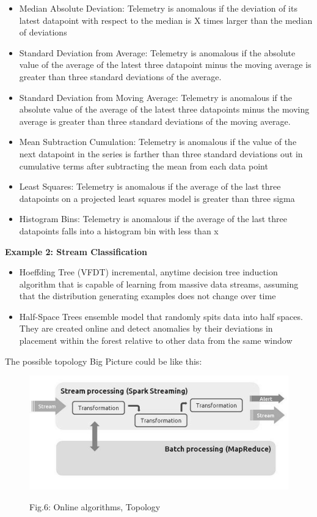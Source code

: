 \documentclass[10pt, a5paper]{article}
\begin{document}
\begin{itemize}
  \item Median Absolute Deviation: Telemetry is anomalous if the \linebreak deviation of its latest datapoint
with respect to the median is X times larger than the median of deviations
  \item Standard Deviation from Average: Telemetry is anomalous if the absolute value of the average of the latest three datapoint minus the moving average is greater than three standard deviations of the average.
  \item Standard Deviation from Moving Average: Telemetry is anomalous if the absolute value of the average of the latest three datapoints minus the moving average is greater than three standard deviati\-ons of the moving average.
  \item Mean Subtraction Cumulation: Telemetry is anomalous if the value of the next datapoint in the series is farther than three standard deviations out in cumulative terms after subtracting the mean from each data point
  \item Least Squares: Telemetry is anomalous if the average of the last three datapoints on a projected least squares model is greater than three sigma
  \item Histogram Bins: Telemetry is anomalous if the average of the last three datapoints falls into a histogram bin with less than x
\end{itemize}

\textbf{Example 2: Stream Classification}

\begin{itemize}
  \item Hoeffding Tree (VFDT)
incremental, anytime decision tree \linebreak induction algorithm that is capable of learning from massive data streams, assuming that the distribution generating examples does not change over time
  \item Half-Space Trees
ensemble model that randomly spits data into half spaces. They are created online and detect anomalies by their deviations in placement within the forest relative to other data from the same window
\end{itemize}

The possible topology Big Picture could be like this:
\begin{figure}[h!]
  \centering 
  \includegraphics[scale=0.8]{16_2015_fig6}
    
  Fig.6: Online algorithms, Topology
\end{figure}
\end{document}
